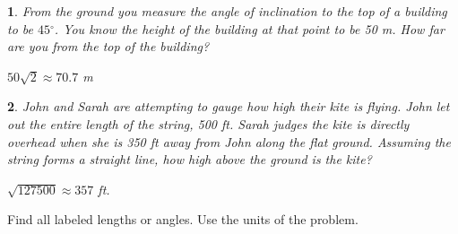 \documentclass{amsbook}
\newtheorem{exc}{}
\newenvironment{ex}{\begin{exc}\normalfont}{\end{exc}}
\numberwithin{section}{chapter}
\numberwithin{equation}{chapter}
\newcommand{\dg}{{^\circ}}
\begin{document}
\begin{ex}
	From the ground you measure the angle of inclination to the top of a building to be $45\dg$. You know the height of the building at that point to be 50 m. How far are you from the top of the building?
	\begin{sol}
		$50\sqrt{2} \approx 70.7$ m
		\end{sol}
\end{ex}

\begin{ex}
	John and Sarah are attempting to gauge how high their kite is flying. John let out the entire length of the string, 500 ft. Sarah judges the kite is directly overhead when she is 350 ft away from John along the flat ground. Assuming the string forms a straight line, how high above the ground is the kite?
	\begin{sol}
		$\sqrt{127500} \approx 357$ ft.
	\end{sol}
\end{ex}

Find all labeled lengths or angles. Use the units of the problem.
\end{document}
